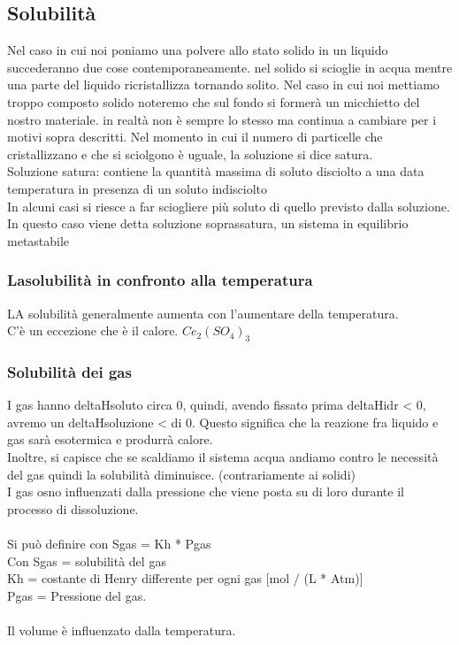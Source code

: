 \subsection{Solubilità}
Nel caso in cui noi poniamo una polvere allo stato solido in un liquido  succederanno due cose contemporaneamente. nel solido si scioglie in acqua mentre una parte del liquido ricristallizza tornando solito. Nel caso in cui noi mettiamo troppo composto solido noteremo che sul fondo si formerà un micchietto del nostro materiale. in realtà non è sempre lo stesso ma continua a cambiare per i motivi sopra descritti. Nel momento in cui il numero di particelle che cristallizzano e che si sciolgono è uguale, la soluzione si dice satura.\\
Soluzione satura: contiene la quantità massima di soluto disciolto a una data temperatura in presenza di un soluto indisciolto\\
In alcuni casi si riesce a far sciogliere più soluto di quello previsto dalla soluzione. In questo caso viene detta soluzione soprassatura, un sistema in equilibrio metastabile
\subsubsection{Lasolubilità in confronto alla temperatura}
LA solubilità generalmente aumenta con l'aumentare della temperatura.\\
C'è un eccezione che è il calore. $Ce_2(SO_4)_3$
\subsubsection{Solubilità dei gas}
I gas hanno deltaHsoluto circa 0, quindi, avendo fissato prima deltaHidr < 0, avremo un deltaHsoluzione < di 0. Questo significa che la reazione fra liquido e gas sarà esotermica e produrrà calore. \\
Inoltre, si capisce che se scaldiamo il sistema acqua andiamo contro le necessità del gas quindi la solubilità diminuisce. (contrariamente ai solidi)\\
I gas osno influenzati dalla pressione che viene posta su di loro durante il processo di dissoluzione. \\\\
Si può definire con Sgas = Kh * Pgas\\
Con Sgas = solubilità del gas\\
Kh = costante di Henry differente per ogni gas [mol / (L * Atm)]\\
Pgas = Pressione del gas. \\\\
Il volume è influenzato dalla temperatura.
